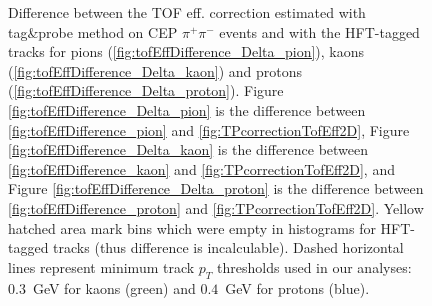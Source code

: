 \begin{figure}[h]
{\begin{subfigure}[b]{\linewidth}{
                }
  \end{subfigure}
} 
\quad
\parbox{0.31\textwidth}{
  \centering
  \begin{subfigure}[b]{\linewidth}{
                }
  \end{subfigure}
}
\caption[Difference between the TOF eff. correction estimated with tag\&probe method and with the HFT-tagged tracks.]%
    {Difference between the TOF eff. correction estimated with tag\&probe method on CEP $\pi^{+}\pi^{-}$ events and with the HFT-tagged tracks for pions (\ref{fig:tofEffDifference_Delta_pion}), kaons (\ref{fig:tofEffDifference_Delta_kaon}) and protons (\ref{fig:tofEffDifference_Delta_proton}). Figure \ref{fig:tofEffDifference_Delta_pion} is the difference between \ref{fig:tofEffDifference_pion} and \ref{fig:TPcorrectionTofEff2D}, Figure \ref{fig:tofEffDifference_Delta_kaon} is the difference between \ref{fig:tofEffDifference_kaon} and \ref{fig:TPcorrectionTofEff2D}, and Figure \ref{fig:tofEffDifference_Delta_proton} is the difference between \ref{fig:tofEffDifference_proton} and \ref{fig:TPcorrectionTofEff2D}. Yellow hatched area mark bins which were empty in histograms for HFT-tagged tracks (thus difference is incalculable). Dashed horizontal lines represent minimum track $p_{T}$ thresholds used in our analyses: $0.3$~GeV for kaons (green) and $0.4$~GeV for protons (blue).}\label{fig:tofEffDifference_Delta}%
\end{figure}



